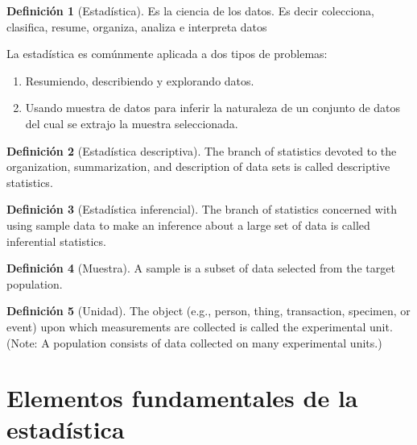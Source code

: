 \documentclass[
  11pt,
]{krantz}
\providecommand{\tightlist}{%
  \setlength{\itemsep}{0pt}\setlength{\parskip}{0pt}}
\theoremstyle{definition}
\newtheorem{definition}{Definición}[chapter]
\theoremstyle{definition}
\theoremstyle{definition}
\theoremstyle{definition}
\theoremstyle{remark}
\begin{document}
\begin{definition}[Estadística]
\protect\hypertarget{def:std}{}\label{def:std}Es la ciencia de los datos. Es decir colecciona, clasifica, resume, organiza, analiza e interpreta datos
\end{definition}

La estadística es comúnmente aplicada a dos tipos de problemas:

\begin{enumerate}
\def\labelenumi{\arabic{enumi}.}
\tightlist
\item
  Resumiendo, describiendo y explorando datos.
\item
  Usando muestra de datos para inferir la naturaleza de un conjunto de datos del cual se extrajo la muestra seleccionada.
\end{enumerate}

\begin{definition}[Estadística descriptiva]
\protect\hypertarget{def:descriptiva}{}\label{def:descriptiva}The branch of statistics devoted to the organization, summarization, and description of data sets is
called descriptive statistics.
\end{definition}

\begin{definition}[Estadística inferencial]
\protect\hypertarget{def:inferencial}{}\label{def:inferencial}The branch of statistics concerned with using sample data to make an inference about a large set of
data is called inferential statistics.
\end{definition}

\begin{definition}[Muestra]
\protect\hypertarget{def:muestra}{}\label{def:muestra}A sample is a subset of data selected from the target population.
\end{definition}

\begin{definition}[Unidad]
\protect\hypertarget{def:unidad}{}\label{def:unidad}The object (e.g., person, thing, transaction, specimen, or event) upon which measurements are
collected is called the experimental unit. (Note: A population consists of data collected on many
experimental units.)
\end{definition}

\hypertarget{elementos-fundamentales-de-la-estaduxedstica}{%
\section{Elementos fundamentales de la estadística}\label{elementos-fundamentales-de-la-estaduxedstica}}
\end{document}
